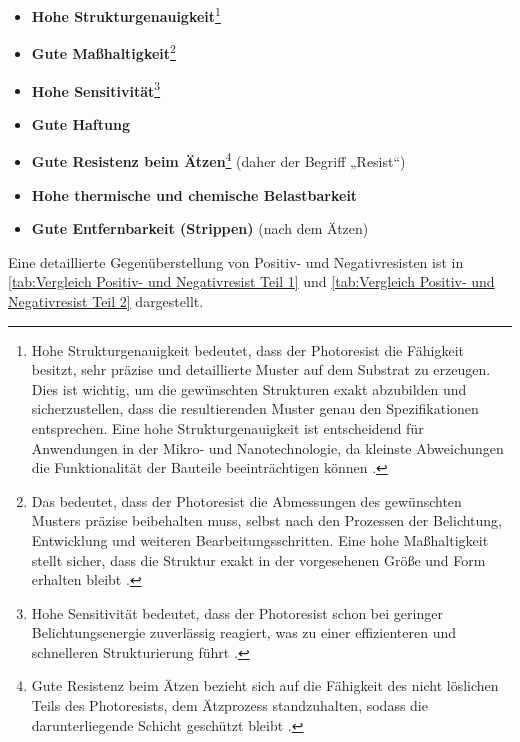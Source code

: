 \documentclass{article} %
\begin{document}
\begin{itemize}
    \item \textbf{Hohe Strukturgenauigkeit}\footnote{Hohe Strukturgenauigkeit bedeutet, dass der Photoresist die Fähigkeit besitzt, sehr präzise und detaillierte Muster auf dem Substrat zu erzeugen. Dies ist wichtig, um die gewünschten Strukturen exakt abzubilden und sicherzustellen, dass die resultierenden Muster genau den Spezifikationen entsprechen. Eine hohe Strukturgenauigkeit ist entscheidend für Anwendungen in der Mikro- und Nanotechnologie, da kleinste Abweichungen die Funktionalität der Bauteile beeinträchtigen können \cite{madou2002, wolf2000, sciencedirect_photoresist}.}
    \item \textbf{Gute Maßhaltigkeit}\footnote{Das bedeutet, dass der Photoresist die Abmessungen des gewünschten Musters präzise beibehalten muss, selbst nach den Prozessen der Belichtung, Entwicklung und weiteren Bearbeitungsschritten. Eine hohe Maßhaltigkeit stellt sicher, dass die Struktur exakt in der vorgesehenen Größe und Form erhalten bleibt \cite{madou2002, wolf2000}.}
    \item \textbf{Hohe Sensitivität}\footnote{Hohe Sensitivität bedeutet, dass der Photoresist schon bei geringer Belichtungsenergie zuverlässig reagiert, was zu einer effizienteren und schnelleren Strukturierung führt \cite{madou2002, sciencedirect_photoresist}.}
    \item \textbf{Gute Haftung}
    \item \textbf{Gute Resistenz beim Ätzen}\footnote{Gute Resistenz beim Ätzen bezieht sich auf die Fähigkeit des nicht löslichen Teils des Photoresists, dem Ätzprozess standzuhalten, sodass die darunterliegende Schicht geschützt bleibt \cite{madou2002, wolf2000}.} (daher der Begriff „Resist“)
    \item \textbf{Hohe thermische und chemische Belastbarkeit}
    \item \textbf{Gute Entfernbarkeit (Strippen)} (nach dem Ätzen)
\end{itemize}

\vspace{1em}

Eine detaillierte Gegenüberstellung von Positiv- und Negativresisten ist in \autoref{tab:Vergleich Positiv- und Negativresist Teil 1} und \autoref{tab:Vergleich Positiv- und Negativresist Teil 2} dargestellt.
\end{document}
